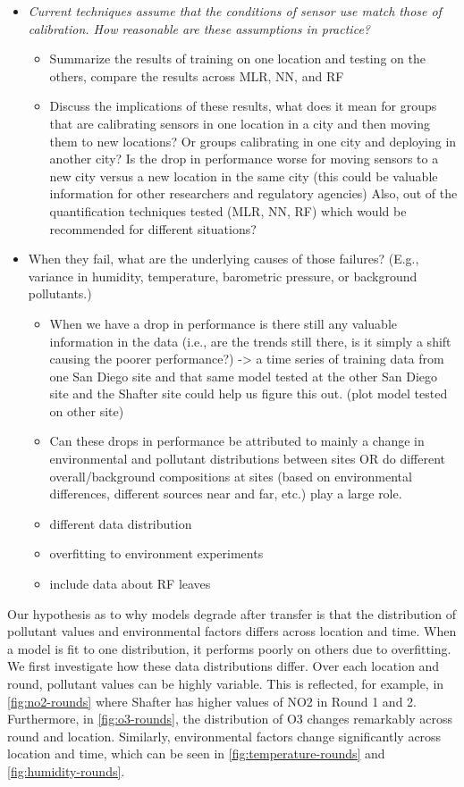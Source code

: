 \documentclass[journal abbreviation, manuscript]{copernicus}
\begin{document}
\begin{itemize}
    \item  \emph{Current techniques assume that the conditions of sensor use match those of calibration.  How reasonable are these assumptions in practice?}
    \begin{itemize}
        \item Summarize the results of training on one location and testing on the others, compare the results across MLR, NN, and RF 
        \item Discuss the implications of these results, what does it mean for groups that are calibrating sensors in one location in a city and then moving them to new locations? Or groups calibrating in one city and deploying in another city? Is the drop in performance worse for moving sensors to a new city versus a new location in the same city (this could be valuable information for other researchers and regulatory agencies) Also, out of the quantification techniques tested (MLR, NN, RF) which would be recommended for different situations?
    \end{itemize}
    \item When they fail, what are the underlying causes of those failures?  (E.g., variance in humidity, temperature, barometric pressure, or background pollutants.)
    \begin{itemize}
        \item When we have a drop in performance is there still any valuable information in the data (i.e., are the trends still there, is it simply a shift causing the poorer performance?) -> a time series of training data from one San Diego site and that same model tested at the other San Diego site and the Shafter site could help us figure this out. (plot model tested on other site)
        \item Can these drops in performance be attributed to mainly a change in environmental and pollutant distributions between sites OR do different overall/background compositions at sites (based on environmental differences, different sources near and far, etc.) play a large role.
        \item different data distribution
        \item overfitting to environment experiments
        \item include data about RF leaves
    \end{itemize}
\end{itemize}

Our hypothesis as to why models degrade after transfer is that the distribution
of pollutant values and environmental factors differs across location and time. When
a model is fit to one distribution, it performs poorly on others due to overfitting.
We first investigate how these data distributions differ. Over each location and round, pollutant values can be highly variable. This is reflected, for example, in \autoref{fig:no2-rounds} where Shafter has higher values of NO2 in Round 1 and 2. Furthermore, in \autoref{fig:o3-rounds}, the distribution of O3 changes remarkably across round and location.
Similarly, environmental factors change significantly across location and time, which can be seen in \autoref{fig:temperature-rounds} and \autoref{fig:humidity-rounds}.
\end{document}
